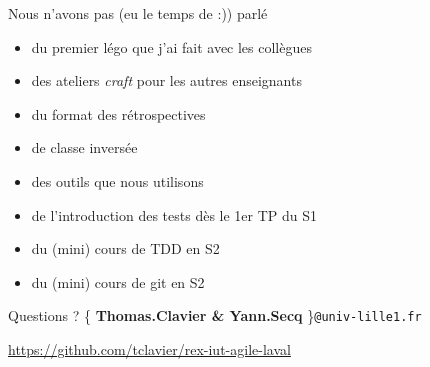 \documentclass{beamer}
\begin{document}
\begin{frame}{Nous n'avons pas (eu le temps de :)) parlé}
  \begin{itemize}
    \item du premier légo que j'ai fait avec les collègues
    \item des ateliers \emph{craft} pour les autres enseignants
    \item du format des rétrospectives
    \item de classe inversée
    \item des outils que nous utilisons
    \item de l'introduction des tests dès le 1er TP du S1
    \item du (mini) cours de TDD en S2
    \item du (mini) cours de git en S2
  \end{itemize}
\end{frame}

\begin{frame}{Questions ?}
  \{ \textbf{Thomas.Clavier \& Yann.Secq} \}\texttt{@univ-lille1.fr}


  \small
  \url{https://github.com/tclavier/rex-iut-agile-laval}
\end{frame}
\end{document}
